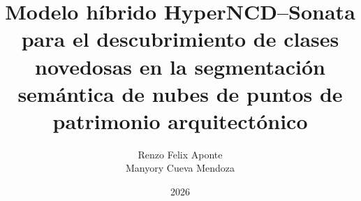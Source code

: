 \documentclass[a4paper,12pt,oneside]{tesisutec}
\begin{document}
\frontmatter


\title{Modelo híbrido HyperNCD--Sonata para el descubrimiento de clases
novedosas en la segmentación semántica de nubes de puntos de patrimonio
arquitectónico}

\author{Renzo Felix Aponte  \\
        Manyory Cueva Mendoza }

\date{2026}

\maketitle





\tableofcontents

\newpage

\listoftables

\newpage

\listoffigures


\mainmatter
\pagestyle{fancy}










\renewcommand{\bibname}{\hfill\Large\bf{REFERENCIAS BIBLIOGRÁFICAS}\hfill}




\end{document}
